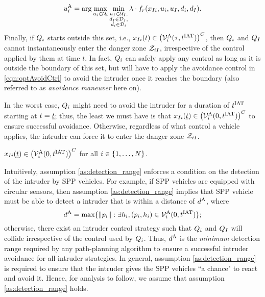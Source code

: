 \begin{equation} \label{eqn:optAvoidCtrl}
{\ctrl^{\text{A}}_{i}} = \arg \max_{\ctrl_i \in \cset_i} \min_{\substack{\ctrl_\intr \in \cset_\intr, \\ \dstb_\intr \in \dset_\intr, \\ \dstb_i \in \dset_i}} \costate \cdot f_r(\state_{\intr i}, \ctrl_i, \ctrl_\intr, \dstb_i, \dstb_\intr).
\end{equation}
\noindent Finally, if $Q_i$ starts outside this set, i.e., $x_{I i}(t) \in \left( \mathcal{V}^{\text{A}}_{i}(\tau, t^\text{IAT})\right)^C$, then  $Q_i$ and $Q_{I}$ cannot instantaneously enter the danger zone $\mathcal{Z}_{iI}$, irrespective of the control applied by them at time $t$. In fact, $Q_i$ can safely apply any control as long as it is outside the boundary of this set, but will have to apply the avoidance control in \eqref{eqn:optAvoidCtrl} to avoid the intruder once it reaches the boundary (also referred to as \textit{avoidance maneuver} here on).

In the worst case, $Q_i$ might need to avoid the intruder for a duration of $t^\text{IAT}$ starting at $t = \underline{t}$; thus, the least we must have is that $x_{I i}(\underline{t}) \in \left(\mathcal{V}^{\text{A}}_{i}(0, t^\text{IAT})\right)^C$ to ensure successful avoidance. Otherwise, regardless of what control a vehicle applies, the intruder can force it to enter the danger zone $\mathcal{Z}_{iI}$.
\begin{assumption}
\label{as:detection_range}
$x_{I i}(\underline{t}) \in \left(\mathcal{V}^{\text{A}}_{i}(0, t^\text{IAT})\right)^C$ for all $i \in \{1, \ldots, N\}$.
\end{assumption}

Intuitively, assumption \ref{as:detection_range} enforces a condition on the detection of the intruder by SPP vehicles. For example, if SPP vehicles are equipped with circular sensors, then assumption \ref{as:detection_range} implies that SPP vehicle must be able to detect a intruder that is within a distance of $d^\text{A}$, where
\begin{equation} \label{eqn:sen_distance}
\dsen = \max\{ \|p_i\|: \exists \npos_i, (p_i, \npos_i) \in \brs^{\text{A}}_{i}(0, \iat) \};
\end{equation} 
otherwise, there exist an intruder control strategy such that $Q_i$ and $Q_{I}$ will collide irrespective of the control used by $Q_i$. Thus, $d^\text{A}$ is the \textit{minimum} detection range required by any path-planning algorithm to ensure a successful intruder avoidance for all intruder strategies. In general, assumption \ref{as:detection_range} is required to ensure that the intruder gives the SPP vehicles ``a chance" to react and avoid it. Hence, for analysis to follow, we assume that assumption \ref{as:detection_range} holds. 

